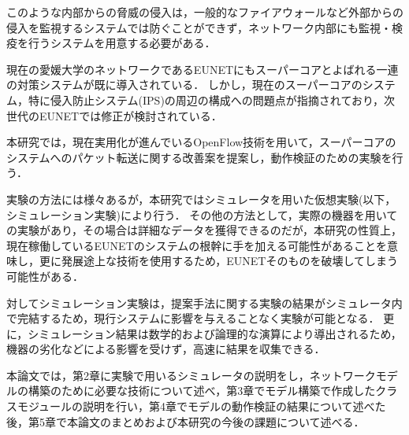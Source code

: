 このような内部からの脅威の侵入は，一般的なファイアウォールなど外部からの侵入を監視するシステムでは防ぐことができず，ネットワーク内部にも監視・検疫を行うシステムを用意する必要がある．

現在の愛媛大学のネットワークであるEUNETにもスーパーコアとよばれる一連の対策システムが既に導入されている．
しかし，現在のスーパーコアのシステム，特に侵入防止システム(IPS)の周辺の構成への問題点が指摘されており，次世代のEUNETでは修正が検討されている．

本研究では，現在実用化が進んでいるOpenFlow技術を用いて，スーパーコアのシステムへのパケット転送に関する改善案を提案し，動作検証のための実験を行う．

実験の方法には様々あるが，本研究ではシミュレータを用いた仮想実験(以下，シミュレーション実験)により行う．
その他の方法として，実際の機器を用いての実験があり，その場合は詳細なデータを獲得できるのだが，本研究の性質上，現在稼働しているEUNETのシステムの根幹に手を加える可能性があることを意味し，更に発展途上な技術を使用するため，EUNETそのものを破壊してしまう可能性がある．

対してシミュレーション実験は，提案手法に関する実験の結果がシミュレータ内で完結するため，現行システムに影響を与えることなく実験が可能となる．
更に，シミュレーション結果は数学的および論理的な演算により導出されるため，機器の劣化などによる影響を受けず，高速に結果を収集できる．

本論文では，第2章に実験で用いるシミュレータの説明をし，ネットワークモデルの構築のために必要な技術について述べ，第3章でモデル構築で作成したクラスモジュールの説明を行い，第4章でモデルの動作検証の結果について述べた後，第5章で本論文のまとめおよび本研究の今後の課題について述べる．